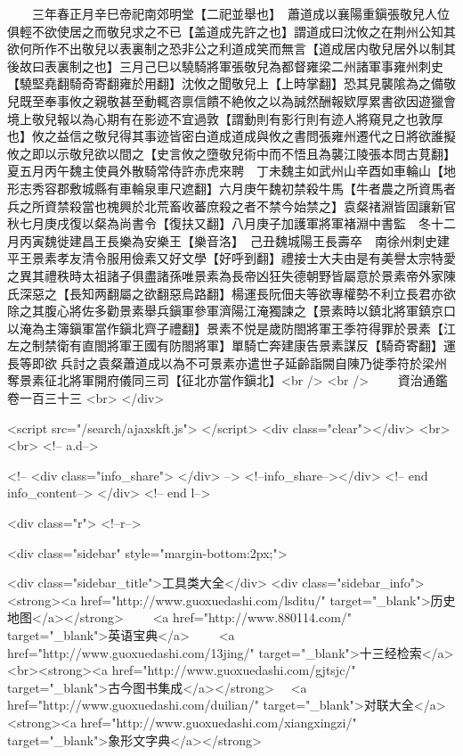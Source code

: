 　　三年春正月辛巳帝祀南郊明堂【二祀並舉也】　蕭道成以襄陽重鎭張敬兒人位俱輕不欲使居之而敬兒求之不已【盖道成先許之也】謂道成曰沈攸之在荆州公知其欲何所作不出敬兒以表裏制之恐非公之利道成笑而無言【道成居内敬兒居外以制其後故曰表裏制之也】三月己巳以驍騎將軍張敬兒為都督雍梁二州諸軍事雍州刺史【驍堅堯翻騎奇寄翻雍於用翻】沈攸之聞敬兒上【上時掌翻】恐其見襲隂為之備敬兒既至奉事攸之親敬甚至動輒咨禀信饋不絶攸之以為誠然酬報欵厚累書欲因遊獵會境上敬兒報以為心期有在影迹不宜過敦【謂動則有影行則有迹人將窺見之也敦厚也】攸之益信之敬兒得其事迹皆密白道成道成與攸之書問張雍州遷代之日將欲誰擬攸之即以示敬兒欲以間之【史言攸之墮敬兒術中而不悟且為襲江陵張本問古莧翻】　夏五月丙午魏主使員外散騎常侍許赤虎來聘　丁未魏主如武州山辛酉如車輪山【地形志秀容郡敷城縣有車輪泉車尺遮翻】六月庚午魏初禁殺牛馬【牛者農之所資馬者兵之所資禁殺當也槐興於北荒畜收蕃庶殺之者不禁今始禁之】袁粲禇淵皆固讓新官秋七月庚戌復以粲為尚書令【復扶又翻】八月庚子加護軍將軍褚淵中書監　冬十二月丙寅魏徙建昌王長樂為安樂王【樂音洛】　己丑魏城陽王長壽卒　南徐州刺史建平王景素孝友清令服用儉素又好文學【好呼到翻】禮接士大夫由是有美譽太宗特愛之異其禮秩時太祖諸子俱盡諸孫唯景素為長帝凶狂失德朝野皆屬意於景素帝外家陳氏深惡之【長知两翻屬之欲翻惡烏路翻】楊運長阮佃夫等欲專權勢不利立長君亦欲除之其腹心將佐多勸景素舉兵鎭軍參軍濟陽江淹獨諫之【景素時以鎮北將軍鎮京口以淹為主簿鎭軍當作鎭北齊子禮翻】景素不悦是歲防閤將軍王季符得罪於景素【江左之制禁衛有直閤將軍王國有防閤將軍】單騎亡奔建康告景素謀反【騎奇寄翻】運長等即欲兵討之袁粲蕭道成以為不可景素亦遣世子延齡詣闕自陳乃徙季符於梁州奪景素征北將軍開府儀同三司【征北亦當作鎭北】<br />
<br />
　　資治通鑑卷一百三十三  <br>
   </div> 

<script src="/search/ajaxskft.js"> </script>
 <div class="clear"></div>
<br>
<br>
 <!-- a.d-->

 <!--
<div class="info_share">
</div> 
-->
 <!--info_share--></div>   <!-- end info_content-->
  </div> <!-- end l-->

<div class="r">   <!--r-->



<div class="sidebar"  style="margin-bottom:2px;">

 
<div class="sidebar_title">工具类大全</div>
<div class="sidebar_info">
<strong><a href="http://www.guoxuedashi.com/lsditu/" target="_blank">历史地图</a></strong>　　
<a href="http://www.880114.com/" target="_blank">英语宝典</a>　　
<a href="http://www.guoxuedashi.com/13jing/" target="_blank">十三经检索</a>　
<br><strong><a href="http://www.guoxuedashi.com/gjtsjc/" target="_blank">古今图书集成</a></strong>　
<a href="http://www.guoxuedashi.com/duilian/" target="_blank">对联大全</a>　<strong><a href="http://www.guoxuedashi.com/xiangxingzi/" target="_blank">象形文字典</a></strong>　

